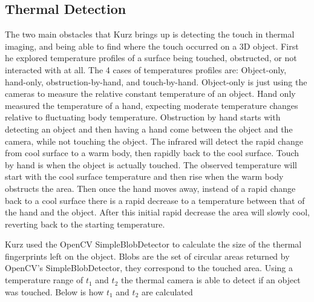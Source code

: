 \documentclass{sig-alternate}
\begin{document}


\subsection{Thermal Detection}
\label{Thermal Detection}
The two main obstacles that Kurz brings up is detecting the touch in thermal imaging, and being able to find where the touch occurred on a 3D object. First he explored temperature profiles of a surface being touched, obstructed, or not interacted with at all. The 4 cases of temperatures profiles are: Object-only, hand-only, obstruction-by-hand, and touch-by-hand. Object-only is just using the cameras to measure the relative constant temperature of an object. Hand only measured the temperature of a hand, expecting moderate temperature changes relative to fluctuating body temperature. Obstruction by hand starts with detecting an object and then having a hand come between the object and the camera, while not touching the object. The infrared will detect the rapid change from cool surface to a warm body, then rapidly back to the cool surface. Touch by hand is when the object is actually touched. The observed temperature  will start with the cool surface temperature and then rise when the warm body obstructs the area. Then once the hand moves away, instead of a rapid change back to a cool surface there is a rapid decrease to a temperature between that of the hand and the object. After this initial rapid decrease the area will slowly cool, reverting back to the starting temperature. 

Kurz used the OpenCV SimpleBlobDetector to calculate the size of the thermal fingerprints left on the object. Blobs are the set of circular areas returned by OpenCV's SimpleBlobDetector, they correspond to the touched area. Using a temperature range of \(t_1\) and \(t_2\) the thermal camera is able to detect if an object was touched. Below is how \(t_1\) and \(t_2\) are calculated
\end{document}

